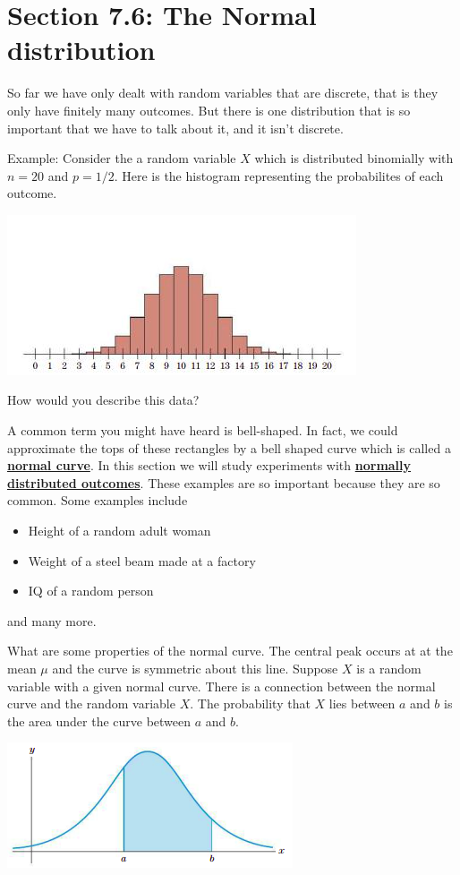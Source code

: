 \documentclass[14,fleqn]{article}
\newcommand{\defn}[1]{\textbf{\underline{#1}}}
\begin{document}
\section{Section 7.6: The Normal distribution}
So far we have only dealt with random variables that are discrete, that is they only have finitely many outcomes. But there is one distribution that is so important that we have to talk about it, and it isn't discrete.

Example: Consider the a random variable $X$ which is distributed binomially with $n=20$ and $p=1/2.$ Here is the histogram representing the probabilites of each outcome.\\
\begin{center}
	\includegraphics{binomialhistogram.jpg}
\end{center}
How would you describe this data?

A common term you might have heard is bell-shaped. In fact, we could approximate the tops of these rectangles by a bell shaped curve which is called a \defn{normal curve}. In this section we will study experiments with \defn{normally distributed outcomes}. These examples are so important because they are so common. Some examples include
\begin{itemize}
	\item Height of a random adult woman
	\item Weight of a steel beam made at a factory
	\item IQ of a random person
\end{itemize}
and many more.

What are some properties of the normal curve. The central peak occurs at at the mean $\mu$ and the curve is symmetric about this line. Suppose $X$ is a random variable with a given normal curve. There is a connection between the normal curve and the random variable $X.$ The probability that $X$ lies between $a$ and $b$ is the area under the curve between $a$ and $b.$\\
\begin{center}
	\includegraphics{normalcurve.png}
\end{center}
\end{document}
